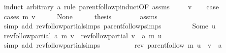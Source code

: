 \begin{isabellebody}
\endisataginvisible
{\isafoldinvisible}%
%
\isadeliminvisible
\isanewline
%
\endisadeliminvisible
%
\isadelimproof
%
\endisadelimproof
%
\isatagproof
{}\isamarkupfalse%
\ {\isacharparenleft}{\kern0pt}induct\ arbitrary{\isacharcolon}{\kern0pt}\ a\ rule{\isacharcolon}{\kern0pt}\ parent{\isachardot}{\kern0pt}follow{\isacharunderscore}{\kern0pt}pinduct{\isacharbrackleft}{\kern0pt}OF\ assms{\isacharbrackright}{\kern0pt}{\isacharparenright}{\kern0pt}\isanewline
\ \ \isamarkupfalse%
\ {\isacharparenleft}{\kern0pt}{}\ v{\isacharparenright}{\kern0pt}\isanewline
\ \ \isamarkupfalse%
\ {\isacharquery}{\kern0pt}case\isanewline
\ \ \isamarkupfalse%
\ {\isacharparenleft}{\kern0pt}cases\ {\isachardoublequoteopen}m\ v{\isachardoublequoteclose}{\isacharparenright}{\kern0pt}\isanewline
\ \ \ \ \isamarkupfalse%
\ None\isanewline
\ \ \ \ \isamarkupfalse%
\ {\isacharquery}{\kern0pt}thesis\isanewline
\ \ \ \ \ \ \isamarkupfalse%
\ assms\isanewline
\ \ \ \ \ \ \isamarkupfalse%
\ {\isacharparenleft}{\kern0pt}simp\ add{\isacharcolon}{\kern0pt}\ rev{\isacharunderscore}{\kern0pt}follow{\isacharunderscore}{\kern0pt}partial{\isachardot}{\kern0pt}simps\ parent{\isachardot}{\kern0pt}follow{\isacharunderscore}{\kern0pt}psimps{\isacharparenright}{\kern0pt}\isanewline
\ \ \isamarkupfalse%
\isanewline
\ \ \ \ \isamarkupfalse%
\ {\isacharparenleft}{\kern0pt}Some\ u{\isacharparenright}{\kern0pt}\isanewline
\ \ \ \ \isamarkupfalse%
\ {\isachardoublequoteopen}rev{\isacharunderscore}{\kern0pt}follow{\isacharunderscore}{\kern0pt}partial\ a\ m\ v\ {\isacharequal}{\kern0pt}\ rev{\isacharunderscore}{\kern0pt}follow{\isacharunderscore}{\kern0pt}partial\ {\isacharparenleft}{\kern0pt}v\ {\isacharhash}{\kern0pt}\ a{\isacharparenright}{\kern0pt}\ m\ u{\isachardoublequoteclose}\isanewline
\ \ \ \ \ \ \isamarkupfalse%
\ {\isacharparenleft}{\kern0pt}simp\ add{\isacharcolon}{\kern0pt}\ rev{\isacharunderscore}{\kern0pt}follow{\isacharunderscore}{\kern0pt}partial{\isachardot}{\kern0pt}simps{\isacharparenright}{\kern0pt}\isanewline
\ \ \ \ \isamarkupfalse%
\ \isamarkupfalse%
\ {\isachardoublequoteopen}{\isachardot}{\kern0pt}{\isachardot}{\kern0pt}{\isachardot}{\kern0pt}\ {\isacharequal}{\kern0pt}\ rev\ {\isacharparenleft}{\kern0pt}parent{\isachardot}{\kern0pt}follow\ m\ u{\isacharparenright}{\kern0pt}\ {\isacharat}{\kern0pt}\ {\isacharparenleft}{\kern0pt}v\ {\isacharhash}{\kern0pt}\ a{\isacharparenright}{\kern0pt}{\isachardoublequoteclose}\isanewline

\end{isabellebody}

